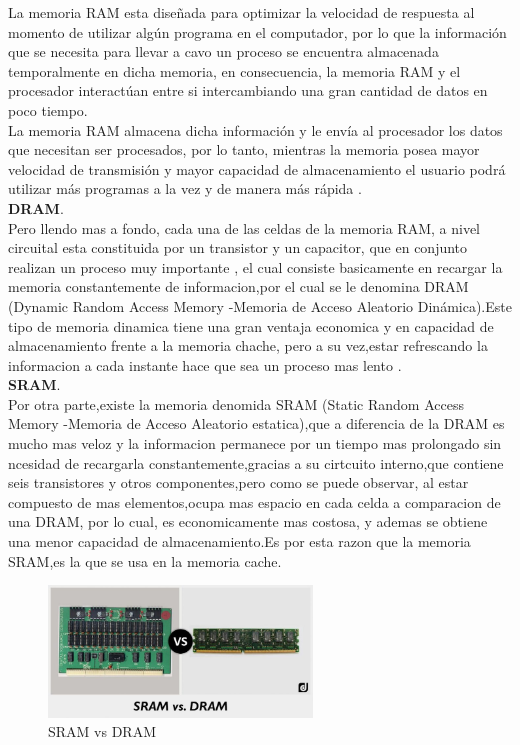 \documentclass{article}
\begin{document}
La memoria RAM esta diseñada para optimizar la velocidad de respuesta al momento de utilizar algún
programa en el computador, por lo que  la información que se  necesita para llevar a cavo un proceso  se encuentra almacenada temporalmente en dicha memoria,  en consecuencia, la memoria RAM y el procesador interactúan entre si intercambiando una gran cantidad de datos en poco tiempo.\\

La memoria RAM almacena dicha información y le envía al procesador los datos que necesitan
ser procesados, por lo tanto, mientras la memoria posea mayor velocidad de transmisión y
mayor capacidad de almacenamiento el usuario podrá utilizar más programas a la vez y de
manera más rápida \cite{apuntes}.\\

\noindent
\textbf{DRAM}.\\
Pero llendo mas a fondo, cada una de las celdas de la memoria RAM, a nivel circuital esta constituida por un transistor y un capacitor, que en conjunto realizan un proceso muy importante , el cual consiste basicamente en recargar la memoria constantemente de informacion,por el cual se le denomina DRAM (Dynamic Random Access Memory -Memoria de Acceso Aleatorio Dinámica).Este tipo de memoria dinamica tiene una gran ventaja economica y en capacidad de almacenamiento frente a la memoria chache, pero a su vez,estar refrescando la informacion a cada instante hace que sea un proceso mas  lento \cite{augusto}.\\

\noindent
\textbf{SRAM}.\\
Por otra parte,existe la memoria denomida SRAM (Static Random Access Memory -Memoria de Acceso Aleatorio estatica),que a diferencia de la DRAM es mucho mas veloz y la informacion permanece por un tiempo mas prolongado sin ncesidad de recargarla constantemente,gracias a su cirtcuito interno,que contiene seis transistores y otros componentes,pero como se puede observar, al estar compuesto de mas elementos,ocupa mas espacio en cada celda a comparacion de una DRAM, por lo cual, es economicamente mas costosa, y ademas se obtiene una menor capacidad de almacenamiento.Es por esta razon que la memoria SRAM,es la que se usa en la memoria cache.

\begin{figure}[h]
\includegraphics[width=7cm]{vs.jpg}
\centering
\caption{SRAM vs DRAM}
\label{vs}
\end{figure}
\end{document}
